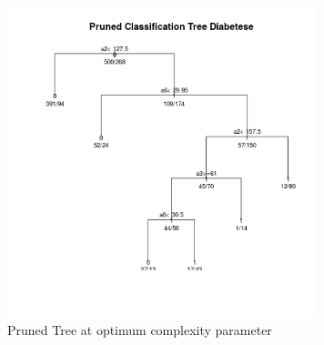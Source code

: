 \documentclass[a4paper]{article}
\begin{document}
\begin{figure}[ht!]
\centering
\includegraphics[width=90mm]{images/ptree.png}
\caption{Pruned Tree at optimum complexity parameter \label{overflow}}
\end{figure}
\end{document}
